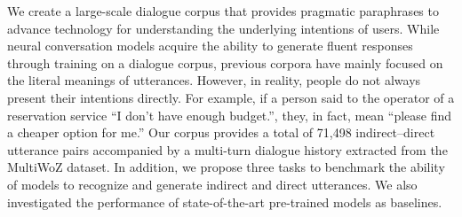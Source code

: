 We create a large-scale dialogue corpus that provides pragmatic paraphrases to advance technology for understanding the underlying intentions of users. While neural conversation models acquire the ability to generate fluent responses through training on a dialogue corpus, previous corpora have mainly focused on the literal meanings of utterances. However, in reality, people do not always present their intentions directly. For example, if a person said to the operator of a reservation service ``I don't have enough budget.'', they, in fact, mean ``please find a cheaper option for me.'' Our corpus provides a total of 71,498 indirect--direct utterance pairs accompanied by a multi-turn dialogue history extracted from the MultiWoZ dataset. In addition, we propose three tasks to benchmark the ability of models to recognize and generate indirect and direct utterances. We also investigated the performance of state-of-the-art pre-trained models as baselines.
